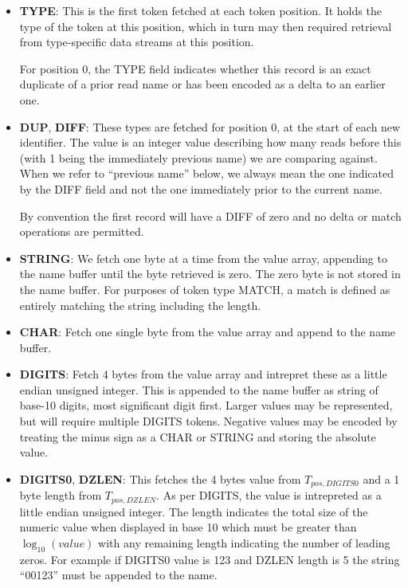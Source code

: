 \documentclass[a4paper]{article}
\begin{document}
\begin{itemize}
\item{\textbf{TYPE}:}
This is the first token fetched at each token position.  It holds the
type of the token at this position, which in turn may then required
retrieval from type-specific data streams at this position.

For position 0, the TYPE field indicates whether this record is an
exact duplicate of a prior read name or has been encoded as a delta to
an earlier one.
  
\item{\textbf{DUP}, \textbf{DIFF}:}
These types are fetched for position 0, at the start of each new
identifier.  The value is an integer value describing how many reads
before this (with 1 being the immediately previous name) we are
comparing against.  When we refer to ``previous name'' below, we
always mean the one indicated by the DIFF field and not the one
immediately prior to the current name.

By convention the first record will have a DIFF of zero and no delta
or match operations are permitted.

\item{\textbf{STRING}:}
We fetch one byte at a time from the value array, appending to the
name buffer until the byte retrieved is zero.  The zero byte is not
stored in the name buffer.
For purposes of token type MATCH, a match is defined as entirely
matching the string including the length.

\item{\textbf{CHAR}:}
Fetch one single byte from the value array and append to the name buffer.

\item{\textbf{DIGITS}:}
Fetch 4 bytes from the value array and intrepret these as a little
endian unsigned integer.  This is appended to the name buffer as
string of base-10 digits, most significant digit first.  Larger
values may be represented, but will require multiple DIGITS tokens.
Negative values may be encoded by treating the minus sign as a CHAR or
STRING and storing the absolute value.

\item{\textbf{DIGITS0}, \textbf{DZLEN}:}
This fetches the 4 bytes value from $T_{pos,DIGITS0}$ and a 1 byte
length from $T_{pos,DZLEN}$.  As per DIGITS, the value is intrepreted as a
little endian unsigned integer.  The length indicates the total
size of the numeric value when displayed in base 10 which must be
greater than $\log_{10}(value)$ with any remaining length indicating
the number of leading zeros.  For example if DIGITS0 value is 123 and
DZLEN length is 5 the string ``00123'' must be appended to the name.


\end{itemize}
\end{document}
